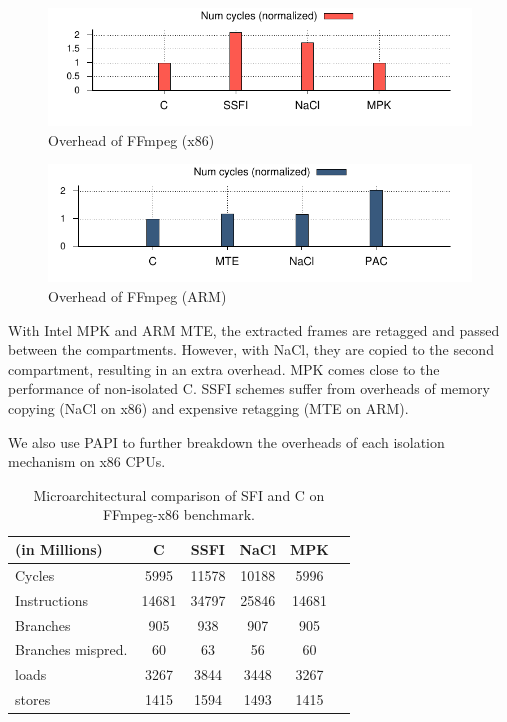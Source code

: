 \begin{figure}[!htbp]
	\includegraphics[width=1.0\columnwidth]{figures/ffmpeg-x86.pdf}
\caption{Overhead of FFmpeg (x86)}
	\label{fig:ffmpeg-x86}
\end{figure}

\begin{figure}[!htbp]
	\includegraphics[width=1.0\columnwidth]{figures/ffmpeg-arm.pdf}
\caption{Overhead of FFmpeg (ARM)}
	\label{fig:ffmpeg-arm}
\end{figure}

With Intel MPK and ARM MTE, the extracted frames are retagged and passed between the compartments. However, with NaCl, they are copied to the second compartment, resulting in an extra overhead. MPK comes close to the performance of non-isolated C. SSFI schemes suffer from overheads of memory copying (NaCl on x86) and expensive retagging (MTE on ARM). 


We also use PAPI to further breakdown the overheads of each isolation mechanism on x86 CPUs. 

\begin{table}[!htbp]
    \begin{small}
    \begin{center}
  \begin{tabular}{| l | c | c | c | c | c |}
  \hline
  (in Millions)    & C   & SSFI   & NaCl & MPK   \\
  \hline
  \hline
  Cycles           & 5995 & 11578  & 10188 & 5996  \\
  Instructions     & 14681  & 34797  & 25846 & 14681 \\
  Branches         & 905   & 938   & 907  & 905   \\
  Branches mispred.& 60   & 63    & 56   & 60    \\
  loads            & 3267  & 3844  & 3448 & 3267  \\
  stores           & 1415  & 1594   & 1493  & 1415   \\
    \hline
    \end{tabular}
    \end{center}
  \end{small}
  \caption{Microarchitectural comparison of SFI and C on FFmpeg-x86 benchmark.}
  \label{table:micro-ffmpeg-x86}
\end{table}
